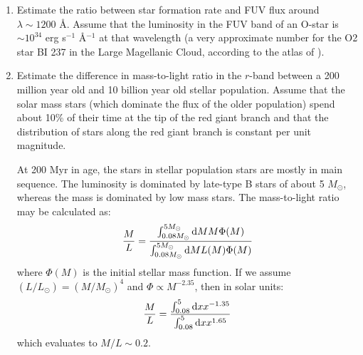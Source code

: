 \begin{enumerate} 
\item Estimate the ratio between star formation rate and FUV flux
    around $\lambda \sim 1200$ \AA.
    Assume that the luminosity in the FUV band of an O-star
    is $\sim 10^{34}$ erg s$^{-1}$ \AA$^{-1}$ at that wavelength (a
    very approximate number for the O2 star BI 237 in the Large
    Magellanic Cloud, according to the atlas of \citealt{smith12a}).
\item Estimate the difference in mass-to-light ratio in the $r$-band
    between a 200 million year old and 10 billion year old stellar
    population. Assume that the solar mass stars (which dominate the
    flux of the older population) spend about 10\% of their time at
    the tip of the red giant branch and that the distribution of stars
    along the red giant branch is constant per unit magnitude.

\begin{answer}
At 200 Myr in age, the stars in stellar population stars are mostly in
main sequence. The luminosity is dominated by late-type B stars of
about 5 $M_\odot$, whereas the mass is dominated by low mass
stars. The mass-to-light ratio may be calculated as:
\begin{equation}
\frac{M}{L} = \frac{\int_{0.08M_\odot}^{5 M_\odot} {\rm d}M M \Phi(M)}
{\int_{0.08M_\odot}^{5 M_\odot} {\rm d}M L(M) \Phi(M)}
\end{equation}
where $\Phi(M)$ is the initial stellar mass function. If we assume
$(L/L_\odot) = (M/M_\odot)^4$ and $\Phi\propto M^{-2.35}$, then in
solar units:
\begin{equation}
\frac{M}{L} = \frac{\int_{0.08}^{5} {\rm d}x x^{-1.35}}
{\int_{0.08}^{5} {\rm d}x x^{1.65}}
\end{equation}
which evaluates to $M/L\sim 0.2$. 


\end{answer}
\end{enumerate}
